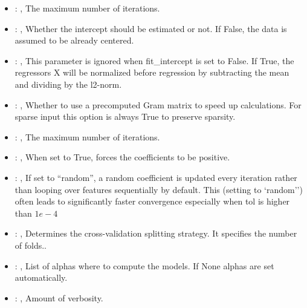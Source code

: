 \begin{itemize}
    \item {}: , 
      The maximum number of iterations.

    \item {}: , 
      Whether the intercept should be estimated or not. If False,
      the data is assumed to be already centered.

    \item {}: , 
      This parameter is ignored when fit\_intercept is set to False. If True,
      the regressors X will be normalized before regression by subtracting the mean and
      dividing by the l2-norm.

    \item {}: , 
      Whether to use a precomputed Gram matrix to speed up calculations.
      For sparse input this option is always True to preserve sparsity.

    \item {}: , 
      The maximum number of iterations.

    \item {}: , 
      When set to True, forces the coefficients to be positive.

    \item {}: , 
      If set to ``random'', a random coefficient is updated every iteration
      rather than looping over features sequentially by default. This (setting to `random'')
      often leads to significantly faster convergence especially when tol is higher than $1e-4$

    \item {}: , 
      Determines the cross-validation splitting strategy.
      It specifies the number of folds..

    \item {}: , 
      List of alphas where to compute the models. If None alphas
      are set automatically.

    \item {}: , 
      Amount of verbosity.
  \end{itemize}


